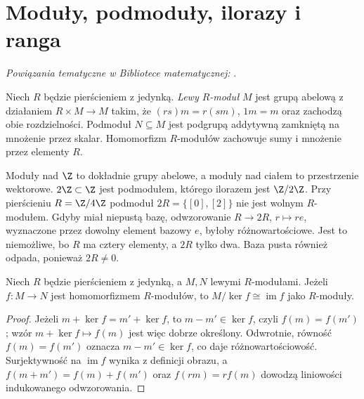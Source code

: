 \section{Moduły, podmoduły, ilorazy i ranga}

\noindent\emph{Powiązania tematyczne w Bibliotece matematycznej:} .

\begin{definicja}
Niech $R$ będzie pierścieniem z jedynką. \emph{Lewy $R$-moduł}
$M$ jest grupą abelową z działaniem $R\times M\to M$ takim,
że $(rs)m=r(sm)$, $1m=m$ oraz zachodzą obie rozdzielności.
Podmoduł $N\subseteq M$ jest podgrupą addytywną zamkniętą
na mnożenie przez skalar. Homomorfizm $R$-modułów zachowuje
sumy i mnożenie przez elementy $R$.
\end{definicja}
\begin{przyklad}
Moduły nad $\Z$ to dokładnie grupy abelowe, a moduły nad
ciałem to przestrzenie wektorowe. $2\Z\subset\Z$ jest
podmodułem, którego ilorazem jest $\Z/2\Z$.
Przy pierścieniu $R=\Z/4\Z$ podmoduł $2R=\{[0],[2]\}$
nie jest wolnym $R$-modułem. Gdyby miał niepustą bazę,
odwzorowanie $R\to2R$, $r\mapsto re$, wyznaczone przez
dowolny element bazowy $e$, byłoby różnowartościowe.
Jest to niemożliwe, bo $R$ ma cztery elementy,
a $2R$ tylko dwa. Baza pusta również odpada,
ponieważ $2R\ne0$.
\end{przyklad}
\begin{twierdzenie}
Niech $R$ będzie pierścieniem z jedynką, a $M,N$
lewymi $R$-modułami. Jeżeli $f:M\to N$ jest
homomorfizmem $R$-modułów, to
$M/\ker f\cong\operatorname{im}f$ jako $R$-moduły.
\end{twierdzenie}
\begin{proof}
Jeżeli $m+\ker f=m'+\ker f$, to
$m-m'\in\ker f$, czyli $f(m)=f(m')$; wzór
$m+\ker f\mapsto f(m)$ jest więc dobrze określony.
Odwrotnie, równość $f(m)=f(m')$ oznacza
$m-m'\in\ker f$, co daje różnowartościowość.
Surjektywność na $\operatorname{im}f$ wynika z definicji obrazu,
a $f(m+m')=f(m)+f(m')$ oraz $f(rm)=rf(m)$
dowodzą liniowości indukowanego odwzorowania.
\end{proof}

